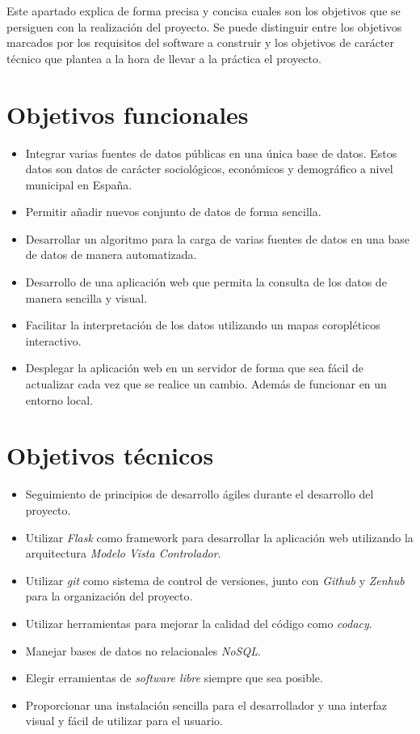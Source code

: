 
Este apartado explica de forma precisa y concisa cuales son los objetivos que se persiguen con la realización del proyecto. Se puede distinguir entre los objetivos marcados por los requisitos del software a construir y los objetivos de carácter técnico que plantea a la hora de llevar a la práctica el proyecto.

\section{Objetivos funcionales}

\begin{itemize}
	\item Integrar varias fuentes de datos públicas en una única base de datos. Estos datos son datos de carácter sociológicos, económicos y demográfico a nivel municipal en España.
	\item Permitir añadir nuevos conjunto de datos de forma sencilla.
	\item Desarrollar un algoritmo para la carga de varias fuentes de datos en una base de datos de manera automatizada.
	\item Desarrollo de una aplicación web que permita la consulta de los datos de manera sencilla y visual.
	\item Facilitar la interpretación de los datos utilizando un mapas coropléticos interactivo.
	\item Desplegar la aplicación web en un servidor de forma que sea fácil de actualizar cada vez que se realice un cambio. Además de funcionar en un entorno local.
\end{itemize}

\section{Objetivos técnicos}

\begin{itemize}
	\item Seguimiento de principios de desarrollo ágiles durante el desarrollo del proyecto.
	\item Utilizar \textit{Flask} como framework para desarrollar la aplicación web utilizando la arquitectura \textit{Modelo Vista Controlador}.
	\item Utilizar \textit{git} como sistema de control de versiones, junto con \textit{Github} y \textit{Zenhub} para la organización del proyecto.
	\item Utilizar herramientas para mejorar la calidad del código como \textit{codacy}.
	\item Manejar bases de datos no relacionales \textit{NoSQL}.
	\item Elegir erramientas de \textit{software libre} siempre que sea posible.
	\item Proporcionar una instalación sencilla para el desarrollador y una interfaz visual y fácil de utilizar para el usuario.
\end{itemize}


